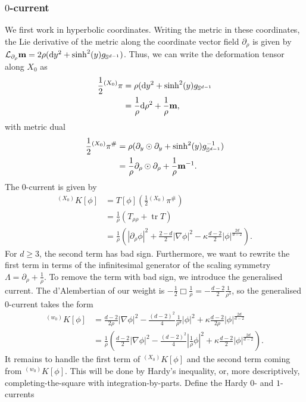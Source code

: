 \subsubsection{$0$-current}

We first work in hyperbolic coordinates. Writing the metric in these coordinates, the Lie derivative of the metric along the coordinate vector field $\partial_\rho$ is given by $\mathcal L_{\partial_\rho} {\bf m} = 2 \rho (\mathrm{d} y^2 + \sinh^2 (y) g_{\mathbb S^{d - 1}})$. Thus, we can write the deformation tensor along $X_0$ as 
	\begin{align*}
		\frac12 {^{(X_0)}} \pi
			&= \rho (\mathrm{d} y^2 + \sinh^2 (y) g_{\mathbb S^{d - 1}} \\
			&= \frac1\rho \mathrm{d} \rho^2 + \frac1\rho {\bf m},	
	\end{align*}
with metric dual
	\begin{align*}
		\frac12 {^{(X_0)}} \pi^\# 
			&= \rho (\partial_y \odot \partial_y + \sinh^2 (y) g_{\mathbb S^{d - 1}}^{-1} ) \\
			&= \frac1\rho \partial_\rho \odot \partial_\rho + \frac1\rho {\bf m}^{-1}. 	
	\end{align*}
The $0$-current is given by 
	\begin{align*}
		{^{(X_0)}} K[\phi]
			&= T[\phi] \left( \frac12 {^{(X_0)}} \pi^\#\right) \\
			&= \frac1\rho \left( T_{\rho \rho} + \operatorname{tr} T \right) \\
			&= \frac1\rho \left( |\partial_\rho \phi|^2 + \frac{2 - d}{2} |\nabla \phi|^2 - \kappa \frac{d - 2}{2} |\phi|^{\frac{2d}{d - 2}} \right).
	\end{align*}
For $d \geq 3$, the second term has bad sign. Furthermore, we want to rewrite the first term in terms of the infinitesimal generator of the scaling symmetry $\Lambda = \partial_\rho + \tfrac1\rho$. To remove the term with bad sign, we introduce the generalised current. The d'Alembertian of our weight is $-\tfrac12 \Box \tfrac1\rho = - \frac{d - 2}{2} \tfrac1{\rho^3}$, so the generalised $0$-current takes the form 
	\begin{align*}
		{^{(w_0)}} K[\phi]
			&= \frac{d - 2}{2\rho} |\nabla \phi|^2 - \frac{(d - 2)^2}{4} \frac{1}{\rho^3} |\phi|^2 + \kappa \frac{d - 2}{2 \rho} |\phi|^{\frac{2d}{d - 2}}\\
			&= \frac1\rho \left( \frac{d - 2}{2} |\nabla \phi|^2 - \frac{(d - 2)^2}{4} \left| \frac1\rho \phi\right|^2 + \kappa \frac{d - 2}{2} |\phi|^{\frac{2d}{d - 2}} \right).
	\end{align*}
It remains to handle the first term of $^{(X_0)} K[\phi]$ and the second term coming from $^{(w_0)} K[\phi]$. This will be done by Hardy's inequality, or, more descriptively, completing-the-square with integration-by-parts. Define the Hardy $0$- and $1$-currents 
